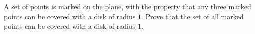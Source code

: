 A set of points is marked on the plane, with the property that any three marked points can be covered with a disk of radius $1$. Prove that the set of all marked points can be covered with a disk of radius $1$.